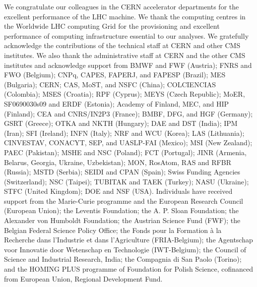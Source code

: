 \documentclass[11pt,twoside,a4paper,cmspaper,final]{cms-tdr}
\begin{document}
We congratulate our colleagues in the CERN accelerator departments for the excellent performance of the LHC machine. We thank the computing centres in the Worldwide LHC computing Grid for the provisioning and excellent performance of computing
infrastructure essential to our analyses. We gratefully acknowledge the contributions of the technical staff at CERN and other CMS institutes. We also thank the administrative staff at CERN and the other CMS institutes and acknowledge support from BMWF and FWF (Austria); FNRS and FWO (Belgium); CNPq, CAPES, FAPERJ, and FAPESP (Brazil); MES (Bulgaria); CERN; CAS, MoST, and NSFC (China); COLCIENCIAS (Colombia); MSES (Croatia); RPF (Cyprus); MEYS (Czech Republic); MoER, SF0690030s09 and ERDF (Estonia); Academy of Finland, MEC, and HIP (Finland); CEA and CNRS/IN2P3 (France); BMBF, DFG, and HGF (Germany); GSRT (Greece); OTKA and NKTH (Hungary); DAE and DST (India); IPM (Iran); SFI (Ireland); INFN (Italy); NRF and WCU (Korea); LAS (Lithuania); CINVESTAV, CONACYT, SEP, and UASLP-FAI (Mexico); MSI (New Zealand); PAEC (Pakistan); MSHE and NSC (Poland); FCT (Portugal); JINR (Armenia, Belarus, Georgia, Ukraine, Uzbekistan); MON, RosAtom, RAS and RFBR (Russia); MSTD (Serbia); SEIDI and CPAN (Spain); Swiss Funding Agencies (Switzerland); NSC (Taipei); TUBITAK and TAEK (Turkey); NASU (Ukraine); STFC (United Kingdom); DOE and NSF (USA). Individuals have received support from the Marie-Curie programme and the European Research Council (European Union); the Leventis Foundation; the A. P. Sloan Foundation; the Alexander von Humboldt Foundation; the Austrian Science Fund (FWF); the Belgian Federal Science Policy Office; the Fonds pour la Formation \`a la Recherche dans l'Industrie et dans l'Agriculture (FRIA-Belgium); the Agentschap voor Innovatie door Wetenschap en Technologie (IWT-Belgium); the Council of Science and Industrial Research, India; the Compagnia di San Paolo (Torino); and the HOMING PLUS programme of Foundation for Polish Science, cofinanced from European Union, Regional Development Fund.
\end{document}
